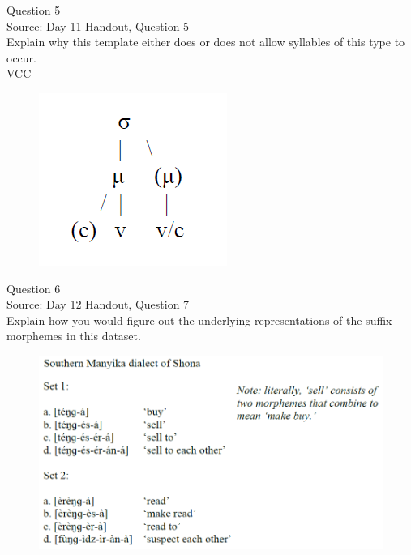 \documentclass[12pt]{article}
\begin{document}
{\large Question 5}\\

Source: Day 11 Handout, Question 5\\

Explain why this template either does or does not allow syllables of this type to occur.\\

VCC

\begin{figure}[H]
\includegraphics{../images/ponapean_syllabletemplate.png}
\end{figure}

\newpage

{\large Question 6}\\

Source: Day 12 Handout, Question 7\\

Explain how you would figure out the underlying representations of the suffix morphemes in this dataset.\\

\begin{figure}[H]
\includegraphics{../images/shona.png}
\end{figure}

\newpage
\end{document}
